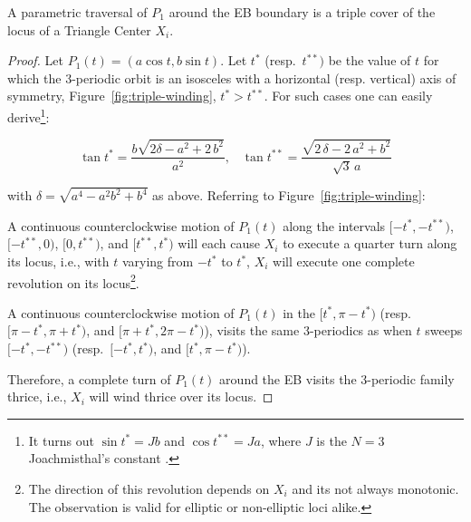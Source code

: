 \begin{lemma*}[\ref{lem:center-cover}]
A parametric traversal of $P_1$ around the EB boundary is a triple cover of the locus of a Triangle Center $X_i$.
\end{lemma*}

\begin{proof}
Let $P_1(t)=\left(a \cos{t},b \sin{t}\right)$. Let $t^*$ (resp.~$t^{**})$ be the value of $t$ for which the 3-periodic orbit is an isosceles with a horizontal (resp. vertical) axis of symmetry, Figure~\ref{fig:triple-winding}, $t^*>t^{**}$. For such cases one can easily derive\footnote{It turns out $\sin{t^*}=J b$ and $\cos{t^{**}}=J a$, where $J$ is the $N=3$ Joachmisthal's constant \cite{sergei91}.}:

\begin{equation*}
\tan{t^*}=\frac{b\sqrt{2\delta-{a}^{2}+2\,{b}^{2}}}{a^{2}}, \;\;\;\tan{t^{**}}=  \frac{ \sqrt {2\,\delta-2\,{a}^{2}+{b}^{2}}}{\sqrt{3}\, a}
\end{equation*}

\noindent with $\delta=\sqrt{a^4-a^2 b^2+b^4}$ as above. Referring to Figure~\ref{fig:triple-winding}:

\begin{affirmation}
\label{obs:tstar1}
A continuous counterclockwise motion of $P_1(t)$ along the intervals $[-t^*,-t^{**})$, $[-t^{**},0)$, $[0,t^{**})$, and $[t^{**},t^*)$ will each cause $X_i$ to execute a quarter turn along its locus, i.e., with $t$ varying from $-t^*$ to $t^*$, $X_i$ will execute one complete revolution on its locus\footnote{The direction of this revolution depends on $X_i$ and its not always monotonic. The observation is valid for elliptic or non-elliptic loci alike.}.
\end{affirmation}

\begin{affirmation}
\label{obs:tstar2}
A continuous counterclockwise motion of $P_1(t)$ in the $[t^*,\pi-t^{*})$ (resp.~$[\pi-t^{*},\pi+t^{*})$, and $[\pi+t^{*},2\pi-t^*)$), visits the same 3-periodics as when $t$ sweeps $[-t^*,-t^{**})$ (resp.~$[-t^{*},t^{*})$, and $[t^*,\pi-t^*)$).
\end{affirmation}

Therefore, a complete turn of $P_1(t)$ around the EB visits the 3-periodic family thrice, i.e., $X_i$ will wind thrice over its locus.
\end{proof}

